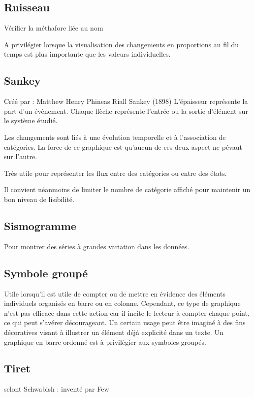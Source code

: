 \documentclass[a4paper,12pt]{article}
\begin{document}
\begin{multicols}{2}
\subsection*{Ruisseau}
\label{sec:orgeda55a4}
Vérifier la méthafore liée au nom

A privilégier lorsque la visualisation des changements en proportions au fil du temps est plus importante que les valeurs individuelles. \autocite{alansmithLexiqueVisuel}
\subsection*{Sankey}
\label{sec:orgcabbaaf}
Créé par : Matthew Henry Phineas Riall Sankey (1898)
L'épaisseur représente la part d'un évènement. Chaque flèche représente l'entrée ou la sortie d'élément sur le système étudié. \autocite{mikeyiHowChooseRight2020}

Les changements sont liés à une évolution temporelle et à l'association de catégories. La force de ce graphique est qu'aucun de ces deux aspect ne pévaut sur l'autre. \autocite{jonathanschwabishComparingCategories2021}

Très utile pour représenter les flux entre des catégories ou entre des états. \autocite{jonathanschwabishComparingCategories2021}

Il convient néanmoins de limiter le nombre de catégorie  affiché pour maintenir un bon niveau de lisibilité. \autocite{jonathanschwabishComparingCategories2021}
\subsection*{Sismogramme}
\label{sec:orgb3b76b9}
Pour montrer des séries à grandes variation dans les données. \autocite{alansmithLexiqueVisuel}
\subsection*{Symbole groupé}
\label{sec:orge7788e5}
Utile lorsqu'il est utile de compter ou de mettre en évidence des éléments individuels organisés en barre ou en colonne. \autocite{alansmithLexiqueVisuel} Cependant, ce type de graphique n'est pas efficace dans cette action car il incite le lecteur à compter chaque point, ce qui peut s'avérer décourageant. \autocite{stephenfewSillyGraphsThat2012} Un certain usage peut être imaginé à des fins décoratives visant à illustrer un élément déjà explicité dans un texte. Un graphique en barre ordonné est à privilégier aux symboles groupés.
\subsection*{Tiret}
\label{sec:orgb189b05}
selont Schwabish : inventé par Few


\end{multicols}
\end{document}
